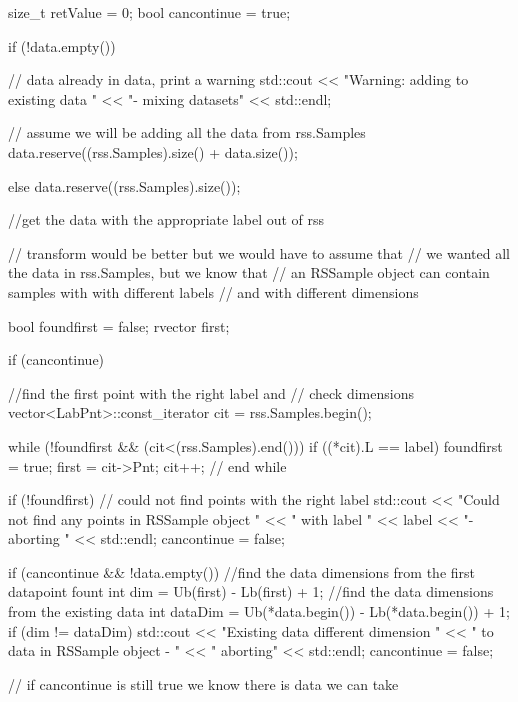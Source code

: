 \begin{DoxyCode}
{

    size_t retValue = 0;
    bool cancontinue = true;

    if (!data.empty()) { // data already in data, print a warning
        std::cout
            << "Warning: adding to existing data "
            << "- mixing datasets"
            << std::endl;

        // assume we will be adding all the data from rss.Samples
        data.reserve((rss.Samples).size() +
                            data.size());
    }

    else {
        data.reserve((rss.Samples).size());
    }

    //get the data with the appropriate label out of rss

    // transform would be better but we would have to assume that
    // we wanted all the data in rss.Samples, but we know that
    // an RSSample object can contain samples with with different labels
    // and with different dimensions

    bool foundfirst = false;
    rvector first;

    if (cancontinue) {
        //find the first point with the right label and
        // check dimensions
        vector<LabPnt>::const_iterator cit = rss.Samples.begin();

        while (!foundfirst && (cit<(rss.Samples).end())) {
            if ((*cit).L == label) {
                foundfirst = true;
                first = cit->Pnt;
            }
            cit++;
        }// end while
    }

    if (!foundfirst) { // could not find points with the right label
        std::cout << "Could not find any points in RSSample object "
            << " with label " << label << "- aborting "
            << std::endl;
        cancontinue = false;
    }

    if (cancontinue && !data.empty()) {
        //find the data dimensions from the first datapoint fount
        int dim = Ub(first) - Lb(first) + 1;
        //find the data dimensions from the existing data
        int dataDim = Ub(*data.begin()) - Lb(*data.begin()) + 1;
        if (dim != dataDim) {
            std::cout
                << "Existing data different dimension "
                << " to data in RSSample object - "
                << " aborting"
                << std::endl;
            cancontinue = false;
        }
    }

    // if cancontinue is still true we know there is data we can take

}
\end{DoxyCode}
